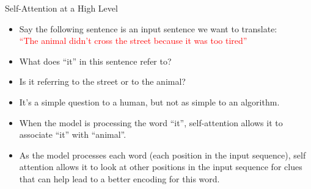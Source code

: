 \documentclass[handout]{beamer}
\begin{document}
\begin{frame}{Self-Attention at a High Level}
\begin{scriptsize}



\begin{itemize}


\item Say the following sentence is an input sentence we want to translate: 
\\ \textcolor{red}{``The animal didn't cross the street because it was too tired''}

\item What does ``it'' in this sentence refer to? 

\item Is it referring to the street or to the animal? 
\item It's a simple question to a human, but not as simple to an algorithm.

\item When the model is processing the word ``it'', self-attention allows it to associate ``it'' with ``animal''.

\item As the model processes each word (each position in the input sequence), self attention allows it to look at other positions in the input sequence for clues that can help lead to a better encoding for this word.


\end{itemize}

\end{scriptsize}


\end{frame}
\end{document}
